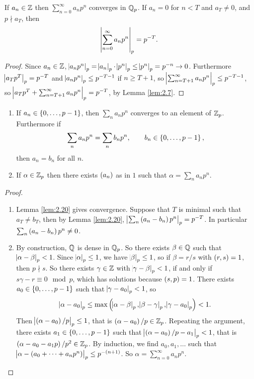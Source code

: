 \begin{lemma}
\label{lem:2.20}
If $ a_n \in \mathbb{Z} $ then $ \sum_{n = 0}^\infty a_np^n $ converges in $ \mathbb{Q}_p $. If $ a_n = 0 $ for $ n < T $ and $ a_T \ne 0 $, and $ p \nmid a_T $, then
$$ \abs{\sum_{n = 0}^\infty a_np^n}_p = p^{-T}. $$
\end{lemma}

\begin{proof}
Since $ a_n \in \mathbb{Z} $, $ \abs{a_np^n}_p = \abs{a_n}_p \cdot \abs{p^n}_p \le \abs{p^n}_p = p^{-n} \to 0 $. Furthermore $ \abs{a_Tp^T}_p = p^{-T} $ and $ \abs{a_np^n}_p \le p^{-T - 1} $ if $ n \ge T + 1 $, so $ \abs{\sum_{n = T + 1}^\infty a_np^n}_p \le p^{-T - 1} $, so $ \abs{a_Tp^T + \sum_{n = T + 1}^\infty a_np^n}_p = p^{-T} $, by Lemma \ref{lem:2.7}.
\end{proof}


\begin{proposition}
\label{prop:2.21}
\hfill
\begin{enumerate}
\item If $ a_n \in \cbr{0, \dots, p - 1} $, then $ \sum_n a_np^n $ converges to an element of $ \mathbb{Z}_p $. Furthermore if
$$ \sum_n a_np^n = \sum_n b_np^n, \qquad b_n \in \cbr{0, \dots, p - 1}, $$
then $ a_n = b_n $ for all $ n $.
\item If $ \alpha \in \mathbb{Z}_p $ then there exists $ \br{a_n} $ as in $ 1 $ such that $ \alpha = \sum_n a_np^n $.
\end{enumerate}
\end{proposition}

\begin{proof}
\hfill
\begin{enumerate}
\item Lemma \ref{lem:2.20} gives convergence. Suppose that $ T $ is minimal such that $ a_T \ne b_T $, then by Lemma \ref{lem:2.20}, $ \abs{\sum_n \br{a_n - b_n}p^n}_p = p^{-T} $. In particular $ \sum_n \br{a_n - b_n}p^n \ne 0 $.
\item By construction, $ \mathbb{Q} $ is dense in $ \mathbb{Q}_p $. So there exists $ \beta \in \mathbb{Q} $ such that $ \abs{\alpha - \beta}_p < 1 $. Since $ \abs{\alpha}_p \le 1 $, we have $ \abs{\beta}_p \le 1 $, so if $ \beta = r / s $ with $ \br{r, s} = 1 $, then $ p \nmid s $. So there exists $ \gamma \in \mathbb{Z} $ with $ \abs{\gamma - \beta}_p < 1 $, if and only if $ s\gamma - r \equiv 0 \mod p $, which has solutions because $ \br{s, p} = 1 $. There exists $ a_0 \in \cbr{0, \dots, p - 1} $ such that $ \abs{\gamma - a_0}_p < 1 $, so
$$ \abs{\alpha - a_0}_p \le \max\br{\abs{\alpha - \beta}_p, \abs{\beta - \gamma}_p, \abs{\gamma - a_0}_p} < 1. $$
Then $ \abs{\br{\alpha - a_0} / p}_p \le 1 $, that is $ \br{\alpha - a_0} / p \in \ZZ_p $. Repeating the argument, there exists $ a_1 \in \cbr{0, \dots, p - 1} $ such that $ \abs{\br{\alpha - a_0} / p - a_1}_p < 1 $, that is $ \br{\alpha - a_0 - a_1p} / p^2 \in \ZZ_p $. By induction, we find $ a_0, a_1, \dots $ such that $ \abs{\alpha - \br{a_0 + \dots + a_np^n}}_p \le p^{-\br{n + 1}} $. So $ \alpha = \sum_{n = 0}^\infty a_np^n $.
\end{enumerate}
\end{proof}

